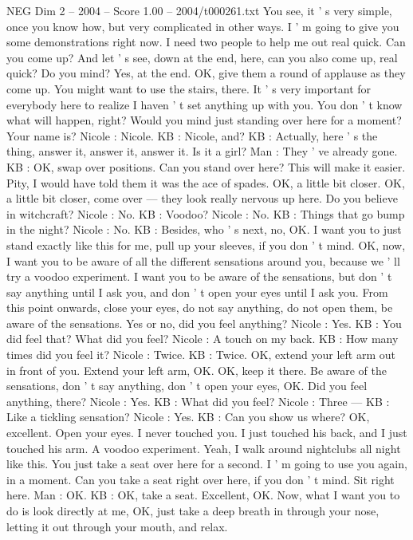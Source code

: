 \begin{textsample}{NEG Dim 2 – 2004 – Score 1.00 – 2004/t000261.txt}
You see, it ' s very simple, once you know how, but very complicated in other ways.
I ' m going to give you some demonstrations right now.
I need two people to help me out real quick.
Can you come up?
And let ' s see, down at the end, here, can you also come up, real quick?
Do you mind?
Yes, at the end.
OK, give them a round of applause as they come up.
You might want to use the stairs, there.
It ' s very important for everybody here to realize I haven ' t set anything up with you.
You don ' t know what will happen, right?
Would you mind just standing over here for a moment?
Your name is?
Nicole : Nicole.
KB : Nicole, and?
KB : Actually, here ' s the thing, answer it, answer it, answer it.
Is it a girl?
Man : They ' ve already gone.
KB : OK, swap over positions.
Can you stand over here?
This will make it easier.
Pity, I would have told them it was the ace of spades.
OK, a little bit closer.
OK, a little bit closer, come over — they look really nervous up here.
Do you believe in witchcraft?
Nicole : No.
KB : Voodoo?
Nicole : No.
KB : Things that go bump in the night?
Nicole : No.
KB : Besides, who ' s next, no, OK.
I want you to just stand exactly like this for me, pull up your sleeves, if you don ' t mind.
OK, now, I want you to be aware of all the different sensations around you, because we ' ll try a voodoo experiment.
I want you to be aware of the sensations, but don ' t say anything until I ask you, and don ' t open your eyes until I ask you.
From this point onwards, close your eyes, do not say anything, do not open them, be aware of the sensations.
Yes or no, did you feel anything?
Nicole : Yes.
KB : You did feel that?
What did you feel?
Nicole : A touch on my back.
KB : How many times did you feel it?
Nicole : Twice.
KB : Twice.
OK, extend your left arm out in front of you.
Extend your left arm, OK.
OK, keep it there.
Be aware of the sensations, don ' t say anything, don ' t open your eyes, OK.
Did you feel anything, there?
Nicole : Yes.
KB : What did you feel?
Nicole : Three — KB : Like a tickling sensation?
Nicole : Yes.
KB : Can you show us where?
OK, excellent.
Open your eyes.
I never touched you.
I just touched his back, and I just touched his arm.
A voodoo experiment.
Yeah, I walk around nightclubs all night like this.
You just take a seat over here for a second.
I ' m going to use you again, in a moment.
Can you take a seat right over here, if you don ' t mind.
Sit right here.
Man : OK.
KB : OK, take a seat.
Excellent, OK.
Now, what I want you to do is look directly at me, OK, just take a deep breath in through your nose, letting it out through your mouth, and relax.

\end{textsample}

